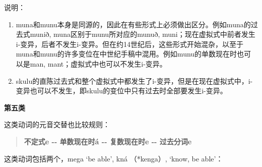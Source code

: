 说明：

\begin{enumerate}
  \def\labelenumi{\arabic{enumi})}
  \item
        muna和munu本身是同源的，因此在有些形式上必须做出区分。例如muna的过去式munið,
        muna区别于munu所对应的munuð,
        muni；现在虚拟式中前者发生i-变异，后者不发生i-变异。但在约14世纪后，这些形式开始混杂，以至于muna和munu的许多变位在中世纪手稿中混用。例如munu的单数现在时也可以是man,
        mant；虚拟式中也可以不发生i-变异。
  \item
        skulu的直陈过去式和整个虚拟式中都发生了i-变异，但是在现在虚拟式中，i-变异也可以不发生，即skulu的变位中只有过去时全部要发生i-变异。
\end{enumerate}

\textbf{第五类}

这类动词的元音交替也比较规则：

\begin{quote}
  \textbf{不定式e -\/- 单数现在时á -\/- 复数现在时e -\/- 过去分词e}
\end{quote}

这类动词包括两个，mega `be able‌', kná （*kenga）, `know, be able‌'：

